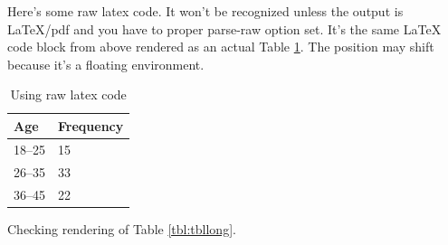 \documentclass[man,longtable,noextraspace,floatsintext]{apa6}
\begin{document}
Here's some raw latex code. It won't be recognized unless the output is
LaTeX/pdf and you have to proper parse-raw option set. It's the same
LaTeX code block from above rendered as an actual Table
\ref{tbl:rawtex}. The position may shift because it's a floating
environment.

\begin{table}
\centering
\caption{Using raw latex code}
\label{tbl:rawtex}
\begin{tabular}{|l|l|}\hline
Age & Frequency \\ \hline
18--25  & 15 \\
26--35  & 33 \\
36--45  & 22 \\ \hline
\end{tabular}
\end{table}

Checking rendering of Table \ref{tbl:tbllong}.
\end{document}
